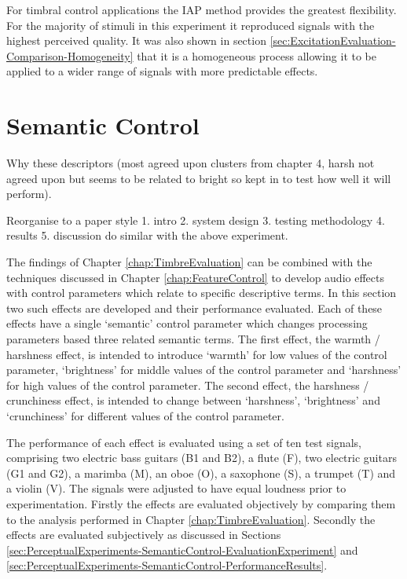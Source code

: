 	For timbral control applications the IAP method provides the greatest flexibility. For the majority of stimuli in
	this experiment it reproduced signals with the highest perceived quality. It was also shown in section
	\ref{sec:ExcitationEvaluation-Comparison-Homogeneity} that it is a homogeneous process allowing it to be applied to
	a wider range of signals with more predictable effects.

\section{Semantic Control}
\label{sec:PerceptualExperiments-SemanticControl}
	\note
	{
		Why these descriptors (most agreed upon clusters from chapter 4, harsh not agreed upon but seems to be
		related to bright so kept in to test how well it will perform).

		Reorganise to a paper style 1. intro 2. system design 3. testing methodology 4. results 5. discussion
		do similar with the above experiment.
	}

	The findings of Chapter \ref{chap:TimbreEvaluation} can be combined with the techniques discussed in Chapter
	\ref{chap:FeatureControl} to develop audio effects with control parameters which relate to specific descriptive
	terms. In this section two such effects are developed and their performance evaluated. Each of these effects have a
	single `semantic' control parameter which changes processing parameters based three related semantic terms. The
	first effect, the warmth / harshness effect, is intended to introduce `warmth' for low values of the
	control parameter, `brightness' for middle values of the control parameter and `harshness' for high values of the
	control parameter. The second effect, the harshness / crunchiness effect, is intended to change between
	`harshness', `brightness' and `crunchiness' for different values of the control parameter.

	The performance of each effect is evaluated using a set of ten test signals, comprising two electric bass guitars
	(B1 and B2), a flute (F), two electric guitars (G1 and G2), a marimba (M), an oboe (O), a saxophone (S), a trumpet
	(T) and a violin (V). The signals were adjusted to have equal loudness prior to experimentation.  Firstly the
	effects are evaluated objectively by comparing them to the analysis performed in Chapter
	\ref{chap:TimbreEvaluation}. Secondly the effects are evaluated subjectively as discussed in Sections
	\ref{sec:PerceptualExperiments-SemanticControl-EvaluationExperiment} and
	\ref{sec:PerceptualExperiments-SemanticControl-PerformanceResults}.

